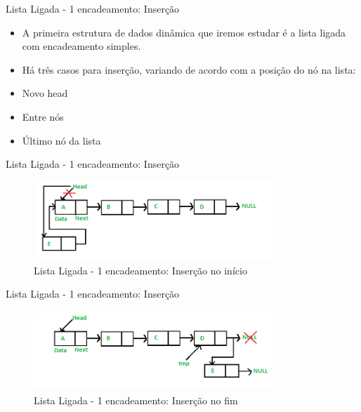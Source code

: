 \begin{frame}
	\begin{block}{Lista Ligada - 1 encadeamento: Inserção}
	\begin{itemize}
			\item A primeira estrutura de dados dinâmica que iremos estudar é a lista ligada com encadeamento simples.
	
			\item Há três casos para inserção, variando de acordo com a posição do nó na lista: 
			
			\item Novo head 
			
			\item Entre nós
			
			\item Último nó da lista
		\end{itemize}
	\end{block}
\end{frame}

\begin{frame}
	\begin{block}{Lista Ligada - 1 encadeamento: Inserção}
		\begin{figure}[!htb]
			\centering	  				
			\includegraphics[height=3cm, width = 9cm]{./pic/Linkedlist_insert_at_start.png}
			\caption{Lista Ligada - 1 encadeamento: Inserção no início}
			\label{fig_LLS_two}
		\end{figure}
	\end{block}
\end{frame}

\begin{frame}
	\begin{block}{Lista Ligada - 1 encadeamento: Inserção}
		\begin{figure}[!htb]
			\centering	  				
			\includegraphics[height=3cm, width = 9cm]{./pic/Linkedlist_insert_last.png}
			\caption{Lista Ligada - 1 encadeamento: Inserção no fim}
			\label{fig_LLS_three}
		\end{figure}
	\end{block}
\end{frame}

